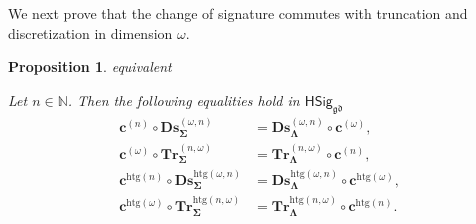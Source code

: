 \documentclass[a4paper, reqno]{amsbook}
\makeatletter
\newcommand{\sig}[1]{\mathbf{#1}}             %
\newcommand{\gd}{\mathfrak{gd}}              %
\newcommand{\htg}{\mathrm{htg}}                %
\newcommand{\bDs}{\mathbf{Ds}}
\newcommand{\bTr}{\mathbf{Tr}}
\theoremstyle{plain}
\newtheorem{proposition}[theorem]{Proposition}
\theoremstyle{definition}
\newcommand*{\CA@leanpending}{}
\newcommand*{\CA@leanrelation}{}
\newcommand*{\lean}[2]{%
  \ifcsname\string\color@lean@#1\endcsname\else
    \PackageError{main}{Unknown relation `#1' in \string\lean}{Use equivalent, weaker or stronger.}%
  \fi
  \gdef\CA@leanrelation{#1}%
  \gdef\CA@leanpending{#2}}
\makeatother
\begin{document}
We next prove that the change of signature commutes with truncation and discretization in dimension $\omega$.

\begin{proposition}\label{PChangeSigDsTrOmega}\lean{equivalent}{ChangeOfSignature.homogeneousOmegaTruncation_comp,ChangeOfSignature.homogeneousOmegaDiscretization_comp,ChangeOfSignature.heterogeneousDimension_comp}
Let $n\in\mathbb{N}$.
Then the following equalities hold in $\mathsf{HSig}_{\gd}$
\begin{align*}
\mathbf{c}^{(n)}\circ\bDs^{(\omega,n)}_{\sig{\Sigma}}&=\bDs^{(\omega,n)}_{\sig{\Lambda}}\circ\mathbf{c}^{(\omega)},
\\
\mathbf{c}^{(\omega)}\circ\bTr^{(n,\omega)}_{\sig{\Sigma}}&=\bTr^{(n,\omega)}_{\sig{\Lambda}}\circ\mathbf{c}^{(n)},
\\
\mathbf{c}^{\htg(n)}\circ\bDs^{\htg(\omega,n)}_{\sig{\Sigma}}&=\bDs^{\htg(\omega,n)}_{\sig{\Lambda}}\circ\mathbf{c}^{\htg(\omega)},
\\
\mathbf{c}^{\htg(\omega)}\circ\bTr^{\htg(n,\omega)}_{\sig{\Sigma}}&=\bTr^{\htg(n,\omega)}_{\sig{\Lambda}}\circ\mathbf{c}^{\htg(n)}.
\end{align*}
\end{proposition}
\end{document}
